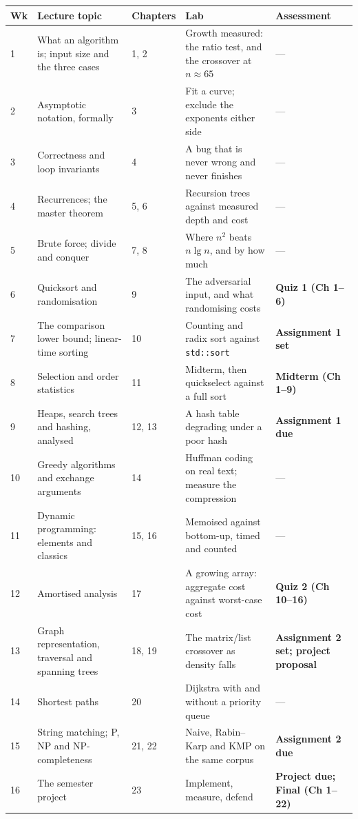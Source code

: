 \begin{longtable}{@{}L{1.1cm}L{3.2cm}L{1.8cm}L{4.4cm}L{3.9cm}@{}}
\toprule
{}
\textbf{Wk} & \textbf{Lecture topic} & \textbf{Chapters} & \textbf{Lab} &
\textbf{Assessment} \\
\midrule
{} & What an algorithm is; input size and the three cases & 1, 2 & Growth
measured: the ratio test, and the crossover at $n \approx 65$ & --- \\
2 & Asymptotic notation, formally & 3 & Fit a curve; exclude the exponents
either side & --- \\
3 & Correctness and loop invariants & 4 & A bug that is never wrong and never
finishes & --- \\
4 & Recurrences; the master theorem & 5, 6 & Recursion trees against measured
depth and cost & --- \\
5 & Brute force; divide and conquer & 7, 8 & Where $n^{2}$ beats $n \lg n$, and
by how much & --- \\
6 & Quicksort and randomisation & 9 & The adversarial input, and what
randomising costs & \textbf{Quiz 1 (Ch 1--6)} \\
7 & The comparison lower bound; linear-time sorting & 10 & Counting and radix
sort against \texttt{std::sort} & \textbf{Assignment 1 set} \\
8 & Selection and order statistics & 11 & Midterm, then quickselect against a
full sort & \textbf{Midterm (Ch 1--9)} \\
9 & Heaps, search trees and hashing, analysed & 12, 13 & A hash table degrading
under a poor hash & \textbf{Assignment 1 due} \\
10 & Greedy algorithms and exchange arguments & 14 & Huffman coding on real
text; measure the compression & --- \\
11 & Dynamic programming: elements and classics & 15, 16 & Memoised against
bottom-up, timed and counted & --- \\
12 & Amortised analysis & 17 & A growing array: aggregate cost against
worst-case cost & \textbf{Quiz 2 (Ch 10--16)} \\
13 & Graph representation, traversal and spanning trees & 18, 19 & The
matrix/list crossover as density falls & \textbf{Assignment 2 set;
project proposal} \\
14 & Shortest paths & 20 & Dijkstra with and without a priority queue & --- \\
15 & String matching; P, NP and NP-completeness & 21, 22 & Naive, Rabin--Karp
and KMP on the same corpus & \textbf{Assignment 2 due} \\
16 & The semester project & 23 & Implement, measure, defend & \textbf{Project
due; Final (Ch 1--22)} \\
\bottomrule
\end{longtable}

